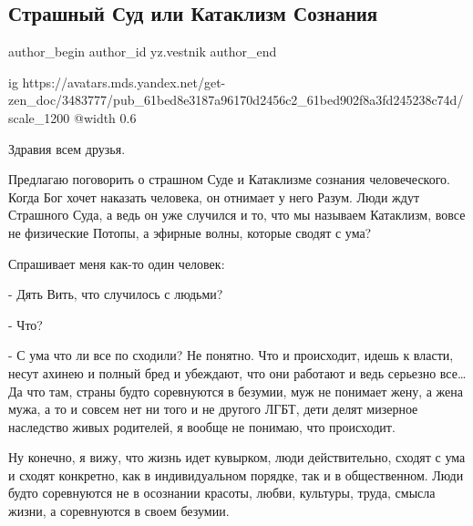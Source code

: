 
 
 
 
 
\subsection{Страшный Суд или Катаклизм Сознания}
\label{sec:20_12_2021.yz.vestnik.1.kataklizm_soznania}

\ifcmt
 author_begin
   author_id yz.vestnik
 author_end
\fi

\begin{center}
\ifcmt
  ig https://avatars.mds.yandex.net/get-zen_doc/3483777/pub_61bed8e3187a96170d2456c2_61bed902f8a3fd245238c74d/scale_1200
  @width 0.6
\fi

\end{center}

Здравия всем друзья.

Предлагаю поговорить о страшном Суде и Катаклизме сознания человеческого. Когда
Бог хочет наказать человека, он отнимает у него Разум. Люди ждут Страшного
Суда, а ведь он уже случился и то, что мы называем Катаклизм, вовсе не
физические Потопы, а эфирные волны, которые сводят с ума?

Спрашивает меня как-то один человек:

- Дять Вить, что случилось с людьми?

- Что?

- С ума что ли все по сходили? Не понятно. Что и происходит, идешь к власти,
несут ахинею и полный бред и убеждают, что они работают и ведь серьезно все… Да
что там, страны будто соревнуются в безумии, муж не понимает жену, а жена мужа,
а то и совсем нет ни того и не другого ЛГБТ, дети делят мизерное наследство
живых родителей, я вообще не понимаю, что происходит.

Ну конечно, я вижу, что жизнь идет кувырком, люди действительно, сходят с ума и
сходят конкретно, как в индивидуальном порядке, так и в общественном. Люди
будто соревнуются не в осознании красоты, любви, культуры, труда, смысла жизни,
а соревнуются в своем безумии.

